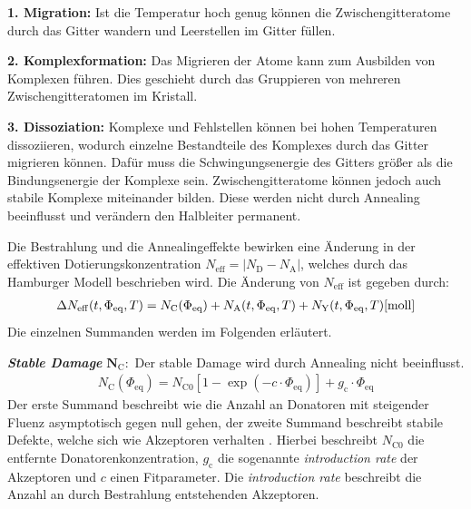 \textbf{1. Migration:} Ist die Temperatur hoch genug können die Zwischengitteratome durch das Gitter wandern und
Leerstellen im Gitter füllen.

\textbf{2. Komplexformation:} Das Migrieren der Atome kann zum Ausbilden von Komplexen führen. Dies geschieht durch das
Gruppieren von mehreren Zwischengitteratomen im Kristall.

\textbf{3. Dissoziation:} Komplexe und Fehlstellen können bei hohen Temperaturen dissoziieren, wodurch einzelne Bestandteile des Komplexes
durch das Gitter migrieren können. Dafür muss die Schwingungsenergie des Gitters größer als die Bindungsenergie der Komplexe sein.
Zwischengitteratome können jedoch auch stabile Komplexe miteinander bilden.
Diese werden nicht durch Annealing
beeinflusst und verändern den Halbleiter permanent.

Die Bestrahlung und die Annealingeffekte bewirken eine Änderung in der effektiven Dotierungskonzentration
${N_{\mathrm{eff}}= |N_{\mathrm{D}}-N_{\mathrm{A}}|}$,
welches durch das Hamburger Modell beschrieben wird.
Die Änderung von $N_{\mathrm{eff}}$ ist gegeben durch:
\begin{align}
  \Delta N_{\mathrm{eff}}(t, \Phi_{\mathrm{eq}}, T)   = N_{\mathrm{C}}(\Phi_{\mathrm{eq}}) + N_{\mathrm{A}}(t, \Phi_{\mathrm{eq}}, T) + N_{\mathrm{Y}}(t, \Phi_{\mathrm{eq}}, T) \text{\cite{moll}}
  \label{eqn:N_eff}
\end{align}
Die einzelnen Summanden werden im Folgenden erläutert.

\textbf{\textit{Stable Damage}} $\symbf{N_{\mathrm{C}}}:$ Der stable Damage wird durch Annealing nicht beeinflusst.
\begin{align}
  N_{\mathrm{C}}(\Phi_{\mathrm{eq}}) = N_{\mathrm{C0}}[1-\exp{(-c \cdot \Phi_{\mathrm{eq}})}] + g_{\mathrm{c}} \cdot \Phi_{\mathrm{eq}}
\end{align}
Der erste Summand beschreibt wie die Anzahl an Donatoren mit
steigender Fluenz asymptotisch gegen null gehen, der zweite Summand beschreibt stabile Defekte, welche sich wie Akzeptoren verhalten \cite{beyer}.
Hierbei beschreibt $N_{\mathrm{C0}}$ die entfernte Donatorenkonzentration, $g_{\mathrm{c}}$ die sogenannte \textit{introduction rate} der Akzeptoren und $c$ einen Fitparameter.
Die \textit{introduction rate} beschreibt die Anzahl an durch Bestrahlung entstehenden Akzeptoren.

